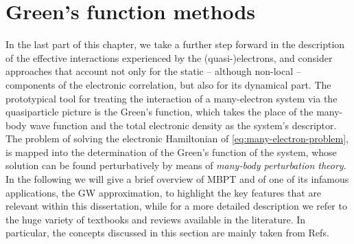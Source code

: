 \section{Green's function methods\label{sec:green-function-methods}}
In the last part of this chapter, we take a further step forward in the description of the effective interactions experienced by the (quasi-)electrons, and consider approaches that account not only for the static -- although non-local -- components of the electronic correlation, but also for its dynamical part. The prototypical tool for treating the interaction of a many-electron system via the quasiparticle picture is the Green's function, which takes the place of the many-body wave function and the total electronic density as the system's descriptor. The problem of solving the electronic Hamiltonian of \cref{eq:many-electron-problem}, is mapped into the determination of the Green's function of the system, whose solution can be found perturbatively by means of \emph{many-body perturbation theory}. In the following we will give a brief overview of MBPT and of one of its infamous applications, the GW approximation, to highlight the key features that are relevant within this dissertation, while for a more detailed description we refer to the huge variety of textbooks and reviews available in the literature. In particular, the concepts discussed in this section are mainly taken from Refs.~\cite{martin_interacting_2016,fetter_quantum_1971,reining_gw_2018,onida_electronic_2002}

